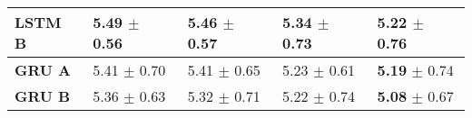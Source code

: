 {{\begin{table}[htbp]
\begin{tabular*}{\linewidth}{@{\extracolsep{\fill}}lllll}
            \\
            \midrule
            \textbf{LSTM B} & 5.49 $\pm$ 0.56 & 5.46 $\pm$ 0.57 & 5.34 $\pm$ 0.73 & \textbf{5.22} $\pm$ 0.76 
            \\
            \midrule
            \textbf{GRU A} & 5.41 $\pm$ 0.70 & 5.41 $\pm$ 0.65 & 5.23 $\pm$ 0.61 & \textbf{5.19} $\pm$ 0.74 
            \\
            \midrule
            \textbf{GRU B} & 5.36 $\pm$ 0.63 & 5.32 $\pm$ 0.71 & 5.22 $\pm$ 0.74 & \textbf{5.08} $\pm$ 0.67
            \\
            \bottomrule
            \end{tabular*}
        \end{table}
    }
}


